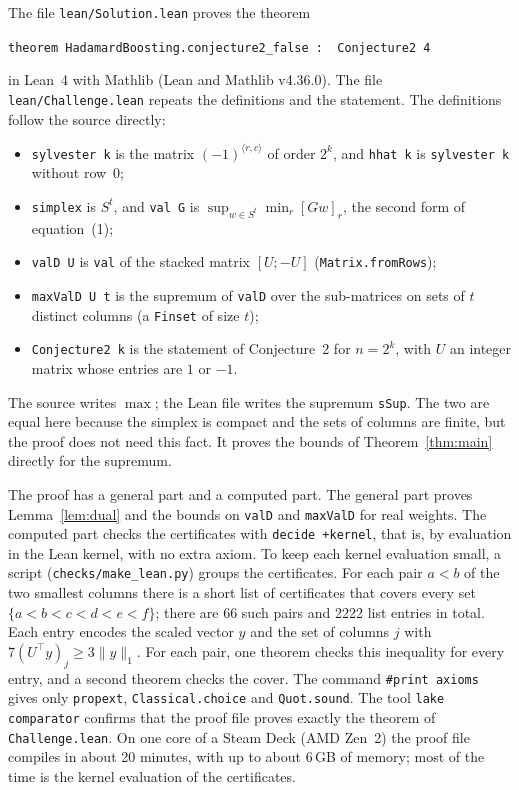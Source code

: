 \documentclass[11pt]{article}
\theoremstyle{remark}
\begin{document}
The file \texttt{lean/Solution.lean} proves the theorem
\begin{center}\texttt{theorem HadamardBoosting.conjecture2\_false : \textlnot\ Conjecture2 4}\end{center}
in Lean~4 \cite{lean4} with Mathlib \cite{mathlib} (Lean and Mathlib v4.36.0). The file
\texttt{lean/Challenge.lean} repeats the definitions and the statement. The definitions follow
the source directly:
\begin{itemize}
\item \texttt{sylvester k} is the matrix $(-1)^{\langle r,c\rangle}$ of order $2^k$, and
\texttt{hhat k} is \texttt{sylvester k} without row~0;
\item \texttt{simplex} is $S^t$, and \texttt{val G} is
$\sup_{w\in S^t}\min_r[Gw]_r$, the second form of equation~(1);
\item \texttt{valD U} is \texttt{val} of the stacked matrix $[U;-U]$ (\texttt{Matrix.fromRows});
\item \texttt{maxValD U t} is the supremum of \texttt{valD} over the sub-matrices on sets of
$t$ distinct columns (a \texttt{Finset} of size $t$);
\item \texttt{Conjecture2 k} is the statement of Conjecture~2 for $n=2^k$, with $U$ an
integer matrix whose entries are $1$ or $-1$.
\end{itemize}
The source writes $\max$; the Lean file writes the supremum \texttt{sSup}. The two are equal
here because the simplex is compact and the sets of columns are finite, but the proof does
not need this fact. It proves the bounds of Theorem~\ref{thm:main} directly for the
supremum.

The proof has a general part and a computed part. The general part proves
Lemma~\ref{lem:dual} and the bounds on \texttt{valD} and \texttt{maxValD} for real weights.
The computed part checks the certificates with \texttt{decide +kernel}, that is, by
evaluation in the Lean kernel, with no extra axiom. To keep each kernel evaluation small, a
script (\texttt{checks/make\_lean.py}) groups the certificates. For each pair $a<b$ of the two
smallest columns there is a short list of certificates that covers every set
$\{a<b<c<d<e<f\}$; there are 66 such pairs and 2222 list entries in total. Each entry encodes
the scaled vector $y$ and the set of columns $j$ with $7(U^\top y)_j\ge3\|y\|_1$. For each
pair, one theorem checks this inequality for every entry, and a second theorem checks the
cover. The command \texttt{\#print axioms} gives only \texttt{propext},
\texttt{Classical.choice} and \texttt{Quot.sound}. The tool \texttt{lake comparator}
confirms that the proof file proves exactly the theorem of \texttt{Challenge.lean}. On one
core of a Steam Deck (AMD Zen~2) the proof file compiles in about 20 minutes, with up to about
6\,GB of memory; most of the time is the kernel evaluation of the certificates.
\end{document}
